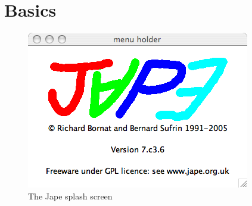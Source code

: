 \documentclass[11pt]{book}
\begin{document}
\chapter{Basics}


\begin{figure}
\centering
\includegraphics[scale=0.5]{pics/splashscreen.png}
\caption{The Jape splash screen}
\label{fig:splashscreen}
\end{figure}
\end{document}
